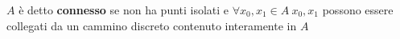 \documentclass[10pt,a4paper,twoside,openright]{book}
\begin{document}
$\displaystyle A$ è detto \textbf{connesso} se non ha punti isolati e $\displaystyle \forall x_{0},x_{1} \in A\ x_{0},x_{1}$ possono essere collegati da un cammino discreto contenuto interamente in $\displaystyle A$


\begin{figure}[htpb]
	\centering



	\begin{tikzpicture}[x=0.75pt,y=0.75pt,yscale=-1,xscale=1]


\end{tikzpicture}
\end{figure}
\end{document}
